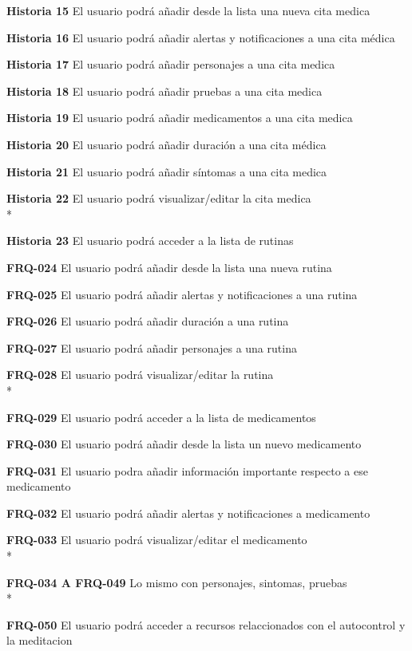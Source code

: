 \documentclass[../pfc.tex]{subfiles}
\begin{document}
	\textbf{Historia 15}	El usuario podrá añadir desde la lista una nueva cita medica
	
	\textbf{Historia 16}	El usuario podrá añadir alertas y notificaciones a una cita médica
	
	\textbf{Historia 17}	El usuario podrá añadir personajes a una cita medica

	\textbf{Historia 18}	El usuario podrá añadir pruebas a una cita medica
	

	\textbf{Historia 19}	El usuario podrá añadir medicamentos a una cita medica
	
	\textbf{Historia 20}	El usuario podrá añadir duración a una cita médica

	
	\textbf{Historia 21}	El usuario podrá añadir síntomas a una cita medica
	
	\textbf{Historia 22}	El usuario podrá visualizar/editar la cita medica\\*
	
	\textbf{Historia 23}	El usuario podrá acceder a la lista de rutinas
	
	\textbf{FRQ-024}	El usuario podrá añadir desde la lista una nueva rutina
	
	\textbf{FRQ-025}	El usuario podrá añadir alertas y notificaciones a una rutina
	
	\textbf{FRQ-026}	El usuario podrá añadir duración a una rutina
	
	\textbf{FRQ-027}	El usuario podrá añadir personajes a una rutina
	
	\textbf{FRQ-028}	El usuario podrá visualizar/editar la rutina\\*
	
	\textbf{FRQ-029}	El usuario podrá acceder a la lista de medicamentos
	
	\textbf{FRQ-030}	El usuario podrá añadir desde la lista un nuevo medicamento
	
	\textbf{FRQ-031}	El usuario podra añadir información importante respecto a ese medicamento
	
	\textbf{FRQ-032}	El usuario podrá añadir alertas y notificaciones a medicamento
	
	\textbf{FRQ-033}	El usuario podrá visualizar/editar el medicamento\\*
	
	\textbf{FRQ-034 A FRQ-049}	Lo mismo con personajes, sintomas, pruebas\\*
	
	\textbf{FRQ-050}	El usuario podrá acceder a recursos relaccionados con el autocontrol y la meditacion
	
\end{document}
